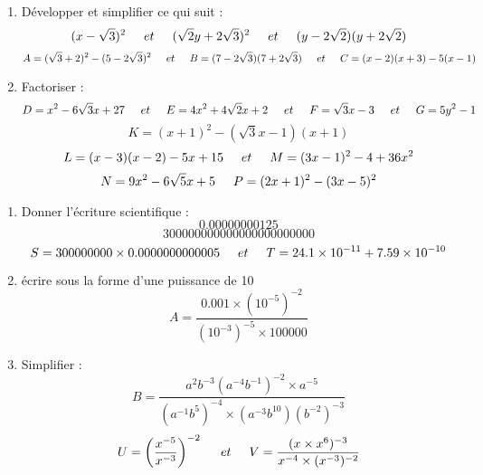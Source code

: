 \documentclass[a4paper,12pt]{article}
\begin{document}
\devoir[prv=true,ds=false,num=1 ,niv=3 ,date=12/10/2023,Rdate=23/10/2023]

\begin{exo}
\begin{enumerate}
\item Développer et simplifier ce qui suit : 
\[ (x-\sqrt{3})^{2}\hspace*{0.5cm}et\hspace*{0.5cm}
	(\sqrt{2}y+2\sqrt{3})^{2}\hspace*{0.5cm}et\hspace*{0.5cm}
		(y-2\sqrt{2})(y+2\sqrt{2})\]
\[
A=(\sqrt{3}+2)^{2}-(5-2\sqrt{3})^{2}\hspace*{0.5 cm}et\hspace*{0.5 cm}
B=(7-2\sqrt{3})(7+2\sqrt{3})\hspace*{0.5 cm}et\hspace*{0.5 cm}
C=(x-2)(x+3)-5(x-1)
\]		
\item Factoriser :
\[ D=x^{2}-6\sqrt{3}x+27\hspace*{0.5cm}et\hspace*{0.5cm}
	E=4x^{2}+4\sqrt{2}x+2\hspace*{0.5cm}et\hspace*{0.5cm}
		F=\sqrt{3}x-3\hspace*{0.5cm}et\hspace*{0.5cm}
		G=5y^{2}-1\]
	\[K=(x+1)^{2}-(\sqrt{3}x-1)(x+1)\]
	\[
L=(x-3)(x-2)-5x+15\hspace*{0.5 cm}et\hspace*{0.5 cm}
M=(3x-1)^{2}-4+36x^{2}\]
\[N=9x^{2}-6\sqrt{5}x+5\hspace*{0.5 cm}
P=(2x+1)^{2}-(3x-5)^{2}
\]
\end{enumerate}
\end{exo}

\begin{exo}
\begin{enumerate}

\item Donner l'écriture scientifique :
\[0.00000000125 \]
\[300000000000000000000000 \]
\[
S=300000000 \times 0.0000000000005 \hspace*{0.5cm}et\hspace*{0.5cm}
T=24.1 \times 10^{-11}+ 7.59 \times 10^{-10}
\]
\item écrire sous la forme d'une puissance de 10
\[ A=\dfrac{0.001 \times (10^{-5})^{-2}}{(10^{-3})^{-5}\times 100000}\]
\item Simplifier :
\[ B=\dfrac{a^{2}b^{-3}(a^{-4}b^{-1})^{-2}\times a^{-5}}{(a^{-1}b^{5})^{-4}\times (a^{-3}b^{10})(b^{-2})^{-3}} \]
\[
U=\left( \dfrac{x^{-5}}{x^{-3}}\right)^{-2} \hspace*{0.5cm}et\hspace*{0.5cm}
V=\dfrac{(x \times x^{6})^{-3}}{x^{-4}\times (x^{-3})^{-2}}
\]
\end{enumerate}
\end{exo}
\end{document}
